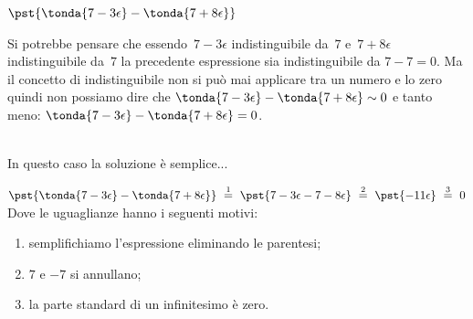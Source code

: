 \begin{esempio}
\(\pst{\tonda{7 -3\epsilon} - \tonda{7 +8\epsilon}}\)

\begin{osservazione}
 Si potrebbe pensare che essendo~\(7 -3\epsilon\) indistinguibile da~\(7\) 
e~\(7 +8\epsilon\) indistinguibile da~\(7\) la precedente espressione 
sia indistinguibile da \(7 - 7 = 0\).
Ma il concetto di indistinguibile non si può mai applicare tra un numero e 
lo zero quindi non possiamo dire che 
\(\tonda{7 -3\epsilon} - \tonda{7 +8\epsilon} \sim 0\) e 
tanto meno: \(\tonda{7 -3\epsilon} - \tonda{7 +8\epsilon} = 0\).
\end{osservazione}\\

In questo caso la soluzione è semplice...

\(\pst{\tonda{7 -3\epsilon} - \tonda{7 +8\epsilon}}
~ \stackrel{1}{=} ~
   \pst{7 -3\epsilon -7 -8\epsilon} 
~ \stackrel{2}{=} ~
   \pst{-11 \epsilon}
~ \stackrel{3}{=} ~ 0\)\\

Dove le uguaglianze hanno i seguenti motivi:
\begin{enumerate} [nosep]
 \item semplifichiamo l'espressione eliminando le parentesi; 
 \item \(7\) e \(-7\) si annullano; 
 \item la parte standard di un infinitesimo è zero.
\end{enumerate}
\end{esempio}

